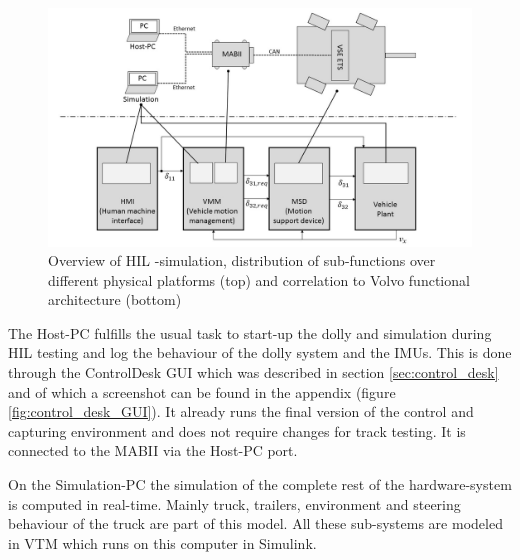 \documentclass[ExampleMasters.tex]{subfiles}
\begin{document}
\begin{figure}[h]
	\centering
	\includegraphics[width=1\linewidth]{figures/HIL_overview}
	\caption{Overview of \gls{HIL} -simulation, distribution of sub-functions over different physical platforms (top) and correlation to Volvo functional architecture (bottom)}
	
	\label{fig:HIL_overview}
\end{figure}


The Host-PC fulfills the usual task to start-up the dolly and simulation during \gls{HIL}  testing and log the behaviour of the dolly system and the \gls{IMU}s. This is done through the ControlDesk \gls{GUI} which was described in section \ref{sec:control_desk} and of which a screenshot can be found in the appendix (figure \ref{fig:control_desk_GUI}). It already runs the final version of the control and capturing environment and does not require changes for track testing. It is connected to the \gls{MABII} via the Host-PC port.

On the Simulation-PC the simulation of the complete rest of the hardware-system is computed in real-time. Mainly truck, trailers, environment and steering behaviour of the truck are part of this model. All these sub-systems are modeled in \gls{VTM}  which runs on this computer in Simulink. 
\end{document}
